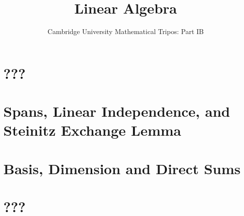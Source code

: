\documentclass{article}
\title{Linear Algebra}
\author{Cambridge University Mathematical Tripos: Part IB}
\begin{document}
\maketitle

\tableofcontentsnewpage{}

\section{???}

\section{Spans, Linear Independence, and Steinitz Exchange Lemma}

\section{Basis, Dimension and Direct Sums}

\section{???}

\end{document}

